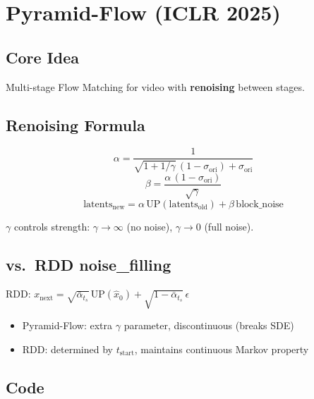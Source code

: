 \documentclass[11pt, a4paper]{article}
\newcommand{\alphabar}{\bar{\alpha}}
\begin{document}
\newpage
\section{Pyramid-Flow (ICLR 2025)}

\subsection{Core Idea}
Multi-stage Flow Matching for video with \textbf{renoising} between stages.

\subsection{Renoising Formula}

\begin{equation}
    \alpha = \frac{1}{\sqrt{1+1/\gamma}\,(1-\sigma_{\mathrm{ori}}) + \sigma_{\mathrm{ori}}}
\end{equation}
\begin{equation}
    \beta = \frac{\alpha\,(1-\sigma_{\mathrm{ori}})}{\sqrt{\gamma}}
\end{equation}
\begin{equation}
    \boxed{\mathrm{latents}_{\mathrm{new}} = \alpha\,\mathrm{UP}(\mathrm{latents}_{\mathrm{old}}) + \beta\,\mathrm{block\_noise}}
\end{equation}

$\gamma$ controls strength: $\gamma\to\infty$ (no noise), $\gamma\to 0$ (full noise).

\subsection{vs.\ RDD noise\_filling}

RDD: $x_{\mathrm{next}} = \sqrt{\alphabar_{t_s}}\,\mathrm{UP}(\hat{x}_0) + \sqrt{1-\alphabar_{t_s}}\,\epsilon$

\begin{itemize}
    \item Pyramid-Flow: extra $\gamma$ parameter, discontinuous (breaks SDE)
    \item RDD: determined by $t_{\mathrm{start}}$, maintains continuous Markov property
\end{itemize}

\subsection{Code}
\end{document}
